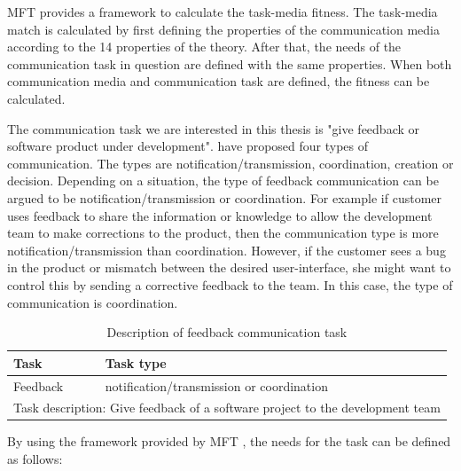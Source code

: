 \documentclass[english,12pt,a4paper,pdftex]{article}
\begin{document}
\ac{MFT} provides a framework to calculate the task-media fitness. The task-media match is calculated by first defining the properties of the communication media according to the 14 properties of the theory. After that, the needs of the communication task in question are defined with the same properties. When both communication media and communication task are defined, the fitness can be calculated.

The communication task we are interested in this thesis is "give feedback or software product under development". \citet{nakamura1995} have proposed four types of communication. The types are notification/transmission, coordination, creation or decision. Depending on a situation, the type of feedback communication can be argued to be notification/transmission or coordination. For example if customer uses feedback to share the information or knowledge to allow the development team to make corrections to the product, then the communication type is more notification/transmission than coordination. However, if the customer sees a bug in the product or mismatch between the desired user-interface, she might want to control this by sending a corrective feedback to the team. In this case, the type of communication is coordination.

\begin{table}[!h]
\renewcommand{\arraystretch}{1.3}
\caption{Description of feedback communication task}
\label{table:description_feedback_communication_task}
\centering
\begin{tabular}{|p{7cm}|p{7cm}|}
\hline
\textbf{Task} & \textbf{Task type}\\
\hline
Feedback & notification/transmission or coordination\\
\hline
\multicolumn{2}{|l|}{Task description:
Give feedback of a software project to the development team} \\ \hline
\end{tabular}
\end{table}

By using the framework provided by \ac{MFT} \citep{higa2007}, the needs for the task can be defined as follows:
\end{document}
